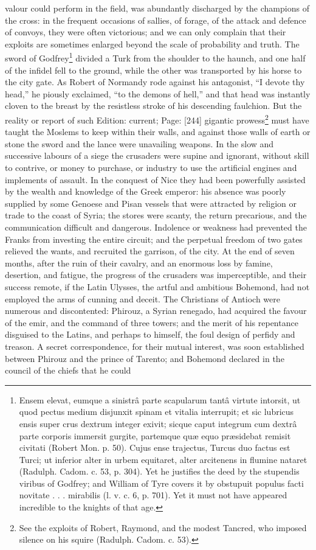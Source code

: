 valour could perform in the field, was abundantly discharged by the champions of the cross: in the frequent occasions of sallies, of forage, of the attack and defence of convoys, they were often victorious; and we can only complain that their exploits are sometimes enlarged beyond the scale of probability and truth. The sword of Godfrey\footnote{Ensem elevat, eumque a sinistrâ parte scapularum tantâ virtute intorsit, ut quod pectus medium disjunxit spinam et vitalia interrupit; et sic lubricus ensis super crus dextrum integer exivit; sicque caput integrum cum dextrâ parte corporis immersit gurgite, partemque quæ equo præsidebat remisit civitati (Robert Mon. p. 50). Cujus ense trajectus, Turcus duo factus est Turci; ut inferior alter in urbem equitaret, alter arcitenens in flumine nataret (Radulph. Cadom. c. 53, p. 304). Yet he justifies the deed by the stupendis viribus of Godfrey; and William of Tyre covers it by obstupuit populus facti novitate . . . mirabilis (l. v. c. 6, p. 701). Yet it must not have appeared incredible to the knights of that age.} divided a Turk from the shoulder to the haunch, and one half of the infidel fell to the ground, while the other was transported by his horse to the city gate. As Robert of Normandy rode against his antagonist, \texthebrew{“}I devote thy head,\texthebrew{}” he piously exclaimed, \texthebrew{“}to the demons of hell,\texthebrew{}” and that head was instantly cloven to the breast by the resistless stroke of his descending faulchion. But the reality or report of such Edition: current; Page: [244] gigantic prowess\footnote{See the exploits of Robert, Raymond, and the modest Tancred, who imposed silence on his squire (Radulph. Cadom. c. 53).} must have taught the Moslems to keep within their walls, and against those walls of earth or stone the sword and the lance were unavailing weapons. In the slow and successive labours of a siege the crusaders were supine and ignorant, without skill to contrive, or money to purchase, or industry to use the artificial engines and implements of assault. In the conquest of Nice they had been powerfully assisted by the wealth and knowledge of the Greek emperor: his absence was poorly supplied by some Genoese and Pisan vessels that were attracted by religion or trade to the coast of Syria; the stores were scanty, the return precarious, and the communication difficult and dangerous. Indolence or weakness had prevented the Franks from investing the entire circuit; and the perpetual freedom of two gates relieved the wants, and recruited the garrison, of the city. At the end of seven months, after the ruin of their cavalry, and an enormous loss by famine, desertion, and fatigue, the progress of the crusaders was imperceptible, and their success remote, if the Latin Ulysses, the artful and ambitious Bohemond, had not employed the arms of cunning and deceit. The Christians of Antioch were numerous and discontented: Phirouz, a Syrian renegado, had acquired the favour of the emir, and the command of three towers; and the merit of his repentance disguised to the Latins, and perhaps to himself, the foul design of perfidy and treason. A secret correspondence, for their mutual interest, was soon established between Phirouz and the prince of Tarento; and Bohemond declared in the council of the chiefs that he could 